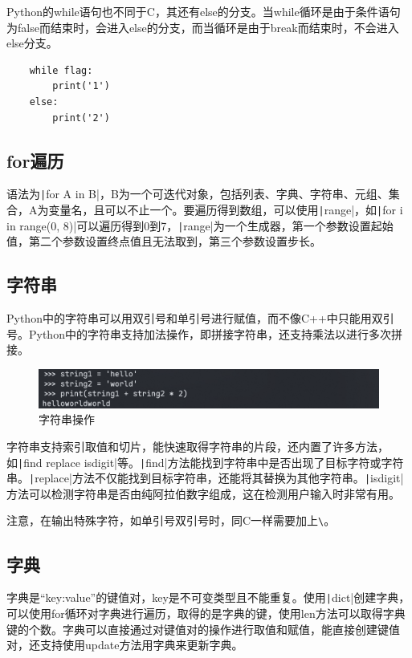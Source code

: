 \documentclass[fontset=ubuntu]{ctexart}
\begin{document}
Python的while语句也不同于C，其还有else的分支。当while循环是由于条件语句为false而结束时，会进入else的分支，而当循环是由于break而结束时，不会进入else分支。
\begin{listing}[htb]
    \begin{verbatim}
    while flag:
        print('1')
    else:
        print('2')
    \end{verbatim}
\end{listing}

\subsection{for遍历}
语法为\texttt|for A in B|，B为一个可迭代对象，包括列表、字典、字符串、元组、集合，A为变量名，且可以不止一个。要遍历得到数组，可以使用\texttt|range|，如\texttt|for i in range(0, 8)|可以遍历得到0到7，\texttt|range|为一个生成器，第一个参数设置起始值，第二个参数设置终点值且无法取到，第三个参数设置步长。

\subsection{字符串}
Python中的字符串可以用双引号和单引号进行赋值，而不像C++中只能用双引号。Python中的字符串支持加法操作，即拼接字符串，还支持乘法以进行多次拼接。
\begin{figure}[htb]
    \centering
    \includegraphics[width=0.75\linewidth]{string_1.png}
    \caption{字符串操作}
    \label{fig:string_1}
\end{figure}

字符串支持索引取值和切片，能快速取得字符串的片段，还内置了许多方法，如\texttt|find replace isdigit|等。\texttt|find|方法能找到字符串中是否出现了目标字符或字符串。\texttt|replace|方法不仅能找到目标字符串，还能将其替换为其他字符串。\texttt|isdigit|方法可以检测字符串是否由纯阿拉伯数字组成，这在检测用户输入时非常有用。

注意，在输出特殊字符，如单引号双引号时，同C一样需要加上\verb|\|。

\subsection{字典}
字典是“key:value”的键值对，key是不可变类型且不能重复。使用\texttt|dict|创建字典，可以使用for循环对字典进行遍历，取得的是字典的键，使用len方法可以取得字典键的个数。字典可以直接通过对键值对的操作进行取值和赋值，能直接创建键值对，还支持使用update方法用字典来更新字典。
\end{document}
